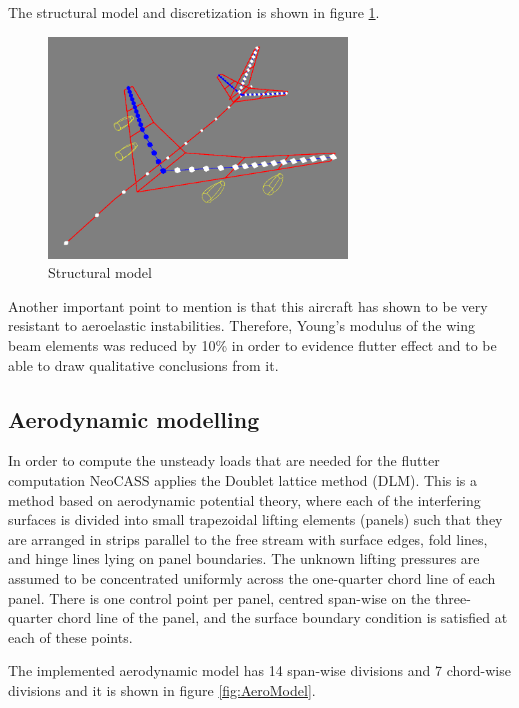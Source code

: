 \documentclass[conference]{IEEEtran}
\newlength\figureheight
\newlength\figurewidth
\begin{document}
The structural model and discretization is shown in figure \ref{fig:StructuralModel}.

\begin{figure}[htp]
  \centering
  \setlength\figureheight{5cm}
  \setlength\figurewidth{7cm}
  \includegraphics[width=225pt]{images/StructuralModel.png}
  \caption{Structural model}
  \label{fig:StructuralModel}
\end{figure}

Another important point to mention is that this aircraft has shown to be very resistant to aeroelastic instabilities. Therefore, Young's modulus of the wing beam elements was reduced by 10\% in order to evidence flutter effect and to be able to draw qualitative conclusions from it.

\subsection{Aerodynamic modelling}
In order to compute the unsteady loads that are needed for the flutter computation NeoCASS applies the Doublet lattice method (DLM). This is a method based on aerodynamic potential theory, where each of the interfering surfaces is divided into small trapezoidal lifting elements (panels) such that they are arranged in strips parallel to the free stream with surface edges, fold lines, and hinge lines lying on panel boundaries. The unknown lifting pressures are assumed to be concentrated uniformly across the one-quarter chord line of each panel. There is one control point per panel, centred span-wise on the three-quarter chord line of the panel, and the surface boundary condition is satisfied at each of these points.

The implemented aerodynamic model has 14 span-wise divisions and 7 chord-wise divisions and it is shown in figure \ref{fig:AeroModel}.
\end{document}
